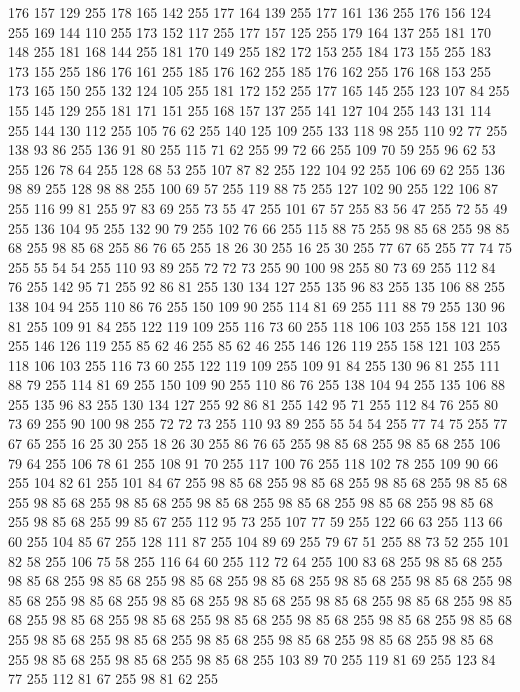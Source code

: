 176 157 129 255 178 165 142 255 177 164 139 255 177 161 136 255 176 156 124 255 169 144 110 255 173 152 117 255 177 157 125 255 179 164 137 255 181 170 148 255 181 168 144 255 181 170 149 255 182 172 153 255 184 173 155 255 183 173 155 255 186 176 161 255 185 176 162 255 185 176 162 255 176 168 153 255 173 165 150 255 132 124 105 255 181 172 152 255 177 165 145 255 123 107 84 255 155 145 129 255 181 171 151 255 168 157 137 255 141 127 104 255 143 131 114 255 144 130 112 255 105 76 62 255 140 125 109 255 133 118 98 255 110 92 77 255 138 93 86 255 136 91 80 255 115 71 62 255 99 72 66 255 109 70 59 255 96 62 53 255 126 78 64 255 128 68 53 255 107 87 82 255 122 104 92 255 106 69 62 255 136 98 89 255 128 98 88 255 100 69 57 255 119 88 75 255 127 102 90 255 122 106 87 255 116 99 81 255 97 83 69 255 73 55 47 255 101 67 57 255 83 56 47 255 72 55 49 255 136 104 95 255 132 90 79 255 102 76 66 255 115 88 75 255 98 85 68 255 98 85 68 255 98 85 68 255
86 76 65 255 18 26 30 255 16 25 30 255 77 67 65 255 77 74 75 255 55 54 54 255 110 93 89 255 72 72 73 255 90 100 98 255 80 73 69 255 112 84 76 255 142 95 71 255 92 86 81 255 130 134 127 255 135 96 83 255 135 106 88 255 138 104 94 255 110 86 76 255 150 109 90 255 114 81 69 255 111 88 79 255 130 96 81 255 109 91 84 255 122 119 109 255 116 73 60 255 118 106 103 255 158 121 103 255 146 126 119 255 85 62 46 255 85 62 46 255 146 126 119 255 158 121 103 255 118 106 103 255 116 73 60 255 122 119 109 255 109 91 84 255 130 96 81 255 111 88 79 255 114 81 69 255 150 109 90 255 110 86 76 255 138 104 94 255 135 106 88 255 135 96 83 255 130 134 127 255 92 86 81 255 142 95 71 255 112 84 76 255 80 73 69 255 90 100 98 255 72 72 73 255 110 93 89 255 55 54 54 255 77 74 75 255 77 67 65 255 16 25 30 255 18 26 30 255 86 76 65 255 98 85 68 255 98 85 68 255 106 79 64 255 106 78 61 255 108 91 70 255 117 100 76 255
118 102 78 255 109 90 66 255 104 82 61 255 101 84 67 255 98 85 68 255 98 85 68 255 98 85 68 255 98 85 68 255 98 85 68 255 98 85 68 255 98 85 68 255 98 85 68 255 98 85 68 255 98 85 68 255 98 85 68 255 99 85 67 255 112 95 73 255 107 77 59 255 122 66 63 255 113 66 60 255 104 85 67 255 128 111 87 255 104 89 69 255 79 67 51 255 88 73 52 255 101 82 58 255 106 75 58 255 116 64 60 255 112 72 64 255 100 83 68 255 98 85 68 255 98 85 68 255 98 85 68 255 98 85 68 255 98 85 68 255 98 85 68 255 98 85 68 255 98 85 68 255 98 85 68 255 98 85 68 255 98 85 68 255 98 85 68 255 98 85 68 255 98 85 68 255 98 85 68 255 98 85 68 255 98 85 68 255 98 85 68 255 98 85 68 255 98 85 68 255 98 85 68 255 98 85 68 255 98 85 68 255 98 85 68 255 98 85 68 255 98 85 68 255 98 85 68 255 98 85 68 255 98 85 68 255 103 89 70 255 119 81 69 255 123 84 77 255 112 81 67 255 98 81 62 255
